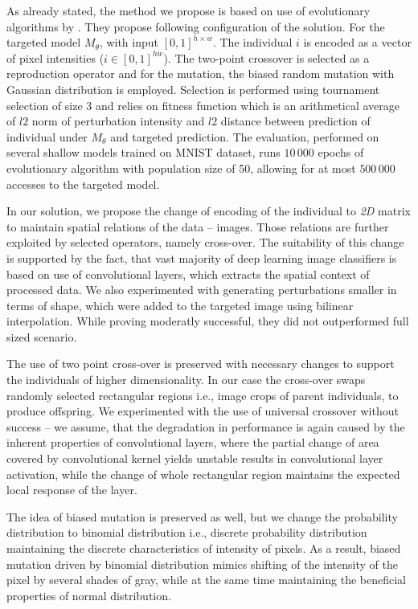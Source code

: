 As already stated, the method we propose is based on use of evolutionary algorithms by \cite{Vidnerova:2016:EGA:2955129.2955178}. They propose following configuration of the solution. For the targeted model $M_\theta$, with input $[0,1]^{h \times w}$. The individual $i$ is encoded as a vector of pixel intensities ($i \in [0, 1]^{h w}$). The two-point crossover is selected as a reproduction operator and for the mutation, the biased random mutation with Gaussian distribution is employed. Selection is performed using tournament selection of size 3 and relies on fitness function which is an arithmetical average of $l2$ norm of perturbation intensity and $l2$ distance between prediction of individual under $M_\theta$ and targeted prediction. The evaluation, performed on several shallow models trained on MNIST dataset, runs $10\,000$ epochs of evolutionary algorithm with population size of 50, allowing for at most $500\,000$ accesses to the targeted model.

In our solution, we propose the change of encoding of the individual to \emph{2D} matrix to maintain spatial relations of the data -- images. Those relations are further exploited by selected operators, namely cross-over. The suitability of this change is supported by the fact, that vast majority of deep learning image classifiers is based on use of convolutional layers, which extracts the spatial context of processed data. We also experimented with generating perturbations smaller in terms of shape, which were added to the targeted image using bilinear interpolation. While proving moderatly successful, they did not outperformed full sized scenario.

The use of two point cross-over is preserved with necessary changes to support the individuals of higher dimensionality. In our case the cross-over swaps randomly selected rectangular regions i.e., image crops of parent individuals, to produce offspring. We experimented with the use of universal crossover without success -- we assume, that the degradation in performance is again caused by the inherent properties of convolutional layers, where the partial change of area covered by convolutional kernel yields unstable results in convolutional layer activation, while the change of whole rectangular region maintains the expected local response of the layer.

The idea of biased mutation is preserved as well, but we change the probability distribution to binomial distribution i.e., discrete probability distribution maintaining the discrete characteristics of intensity of pixels. As a result, biased mutation driven by binomial distribution mimics shifting of the intensity of the pixel by several shades of gray, while at the same time maintaining the beneficial properties of normal distribution.


